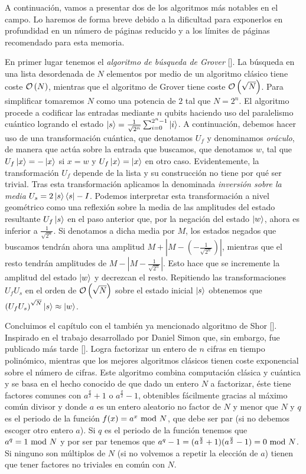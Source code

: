 A continuación, vamos a presentar  dos de los algoritmos más notables en el campo. Lo haremos de forma breve debido a la dificultad para exponerlos en profundidad en un número de páginas reducido y a los límites de páginas recomendado para esta memoria.

En primer lugar tenemos el \textit{algoritmo de búsqueda de Grover} [\cite{grover1996fast}]. La búsqueda en una lista desordenada de $N$ elementos por medio de un algoritmo clásico tiene coste $\mathcal{O}\left(N\right)$, mientras que el algoritmo de Grover tiene coste $\mathcal{O}\left(\sqrt{N}\right)$. Para simplificar tomaremos $N$ como una potencia de $2$ tal que $N=2^n$. El algoritmo procede a codificar las entradas mediante $n$ qubits haciendo uso del paralelismo cuántico logrando el estado $\left|s\right\rangle=\frac{1}{\sqrt{2^n}}\sum_{i=0}^{2^n-1}\left|i\right\rangle$. A continuación, debemos hacer uso de una transformación cuántica, que denotamos $U_f$ y denominamos \textit{oráculo}, de manera que actúa sobre la entrada que buscamos, que denotamos $w$, tal que $U_f\left|x\right\rangle=-\left|x\right\rangle$ si $x=w$ y $U_f\left|x\right\rangle=\left|x\right\rangle$ en otro caso. Evidentemente, la transformación $U_f$ depende de la lista y su construcción no tiene por qué ser trivial. Tras esta transformación aplicamos la denominada \textit{inversión sobre la media} $U_s=2\left|s\right\rangle\left\langle s\right|-I$. Podemos interpretar esta transformación a nivel geométrico como una reflexión sobre la media de las amplitudes del estado resultante $U_f\left|s\right\rangle$ en el paso anterior que, por la negación del estado $\left|w\right\rangle$, ahora es inferior a $\frac{1}{\sqrt{2^n}}$. Si denotamos a dicha media por $M$, los estados negados que buscamos tendrán ahora una amplitud $M + |M -(-\frac{1}{\sqrt{2^n}})|$, mientras que el resto tendrán amplitudes de $M - |M -\frac{1}{\sqrt{2^n}}|$. Esto hace que se incremente la amplitud del estado $\left|w\right\rangle$ y decrezcan el resto. Repitiendo las transformaciones $U_fU_s$ en el orden de $\mathcal{O}\left(\sqrt{N}\right)$ sobre el estado inicial $\left|s\right\rangle$ obtenemos que $\left(U_fU_s\right)^{\sqrt{N}}\left|s\right\rangle\approx\left|w\right\rangle$.

Concluimos el capítulo con el también ya mencionado algoritmo de Shor [\cite{shor1994algorithms}]. Inspirado en el trabajo desarrollado por Daniel Simon que, sin embargo, fue publicado más tarde [\cite{simon1997power}]. Logra factorizar un entero de $n$ cifras en tiempo polinómico, mientras que los mejores algoritmos clásicos tienen coste exponencial sobre el número de cifras. Este algoritmo combina computación clásica y cuántica y se basa en el hecho conocido de que dado un entero $N$ a factorizar, éste tiene factores comunes con $a^{\frac{q}{2}}+1$ o $a^{\frac{q}{2}}-1$, obtenibles fácilmente gracias al máximo común divisor y donde $a$ es un entero aleatorio no factor de $N$ y menor que $N$ y $q$ es el periodo de la función $f(x)=a^x\textrm{ mod } N$, que debe ser par (si no debemos escoger otro entero $a$). Si $q$ es el periodo de la función tenemos que $a^q=1\textrm{ mod } N$ y por ser par tenemos que $a^q-1=(a^\frac{q}{2}+1)(a^\frac{q}{2}-1)=0\textrm{ mod } N$. Si ninguno son múltiplos de $N$ (si no volvemos a repetir la elección de $a$) tienen que tener factores no triviales en común con $N$.

